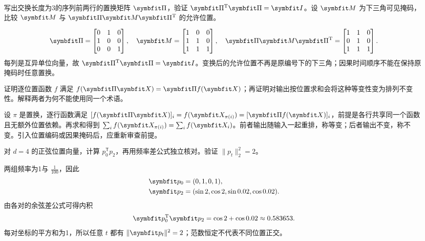 
\begin{exercises}
\begin{exercise} 写出交换长度为3的序列前两行的置换矩阵 $\mat{\Pi}$，验证 $\mat{\Pi}^{\mathrm{T}}\mat{\Pi}=\mat{I}$。设 $\mat{M}$ 为下三角可见掩码，比较 $\mat{M}$ 与 $\mat{\Pi} \mat{M}\mat{\Pi}^{\mathrm{T}}$ 的允许位置。

\begin{solution}
\[
\mat{\Pi}=\begin{bmatrix}0&1&0\\1&0&0\\0&0&1\end{bmatrix},\quad
\mat{M}=\begin{bmatrix}1&0&0\\1&1&0\\1&1&1\end{bmatrix},\quad
\mat{\Pi} \mat{M}\mat{\Pi}^{\mathrm{T}}=\begin{bmatrix}1&1&0\\0&1&0\\1&1&1\end{bmatrix}.
\]
每列是互异单位向量，故 $\mat{\Pi}^{\mathrm{T}}\mat{\Pi}=\mat{I}$。变换后的允许位置不再是原编号下的下三角；因果时间顺序不能在保持原掩码时任意置换。
\end{solution}
\end{exercise}

\begin{exercise} 证明逐位置函数 $f$ 满足 $f(\mat{\Pi} \mat{X})=\mat{\Pi} f(\mat{X})$；再证明对输出按位置求和会将这种等变性变为排列不变性。解释两者为何不能使用同一个术语。

\begin{solution}
设 $\pi$ 是置换，逐行函数满足 $[f(\mat{\Pi} \mat{X})]_i=f(\mat{X}_{\pi(i)})=[\mat{\Pi} f(\mat{X})]_i$，前提是各行共享同一个函数且无额外位置依赖。再求和得到 $\sum_if(\mat{X}_{\pi(i)})=\sum_if(\mat{X}_i)$。前者输出随输入一起重排，称等变；后者输出不变，称不变。引入位置编码或因果掩码后，应重新审查前提。
\end{solution}
\end{exercise}

\begin{exercise}\optional 对 $d=4$ 的正弦位置向量，计算 $p_0^{\mathsf T}p_2$，再用频率差公式独立核对。验证 $\|p_t\|_2^2=2$。

\begin{solution}
两组频率为1与 $\frac{1}{100}$，因此
\[
\begin{aligned}
\vect{p}_0&=(0,1,0,1),\\
\vect{p}_2&=(\sin 2,\cos 2,\sin 0.02,\cos 0.02).
\end{aligned}
\]
由各对的余弦差公式可得内积
\[
\vect{p}_0^{\mathrm{T}}\vect{p}_2=\cos 2+\cos 0.02\approx0.583653.
\]
每对坐标的平方和为1，所以任意 $t$ 都有 $\|\vect{p}_t\|^2=2$；范数恒定不代表不同位置正交。
\end{solution}
\end{exercise}


\end{exercises}
